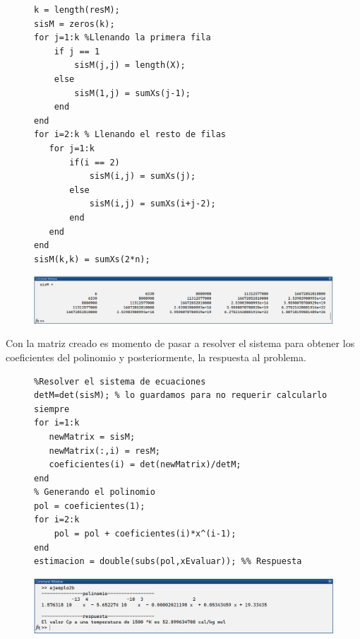 \documentclass[11pt,letterpaper]{article}
\begin{document}
\begin{figure}[H]
\begin{tcolorbox}[title=Ejemplo 2: Implementación en MATLAB]
\begin{verbatim}
k = length(resM);
sisM = zeros(k);
for j=1:k %Llenando la primera fila
    if j == 1
        sisM(j,j) = length(X);
    else
        sisM(1,j) = sumXs(j-1);
    end
end
for i=2:k % Llenando el resto de filas
   for j=1:k
       if(i == 2)
           sisM(i,j) = sumXs(j);
       else
           sisM(i,j) = sumXs(i+j-2);
       end
   end
end
sisM(k,k) = sumXs(2*n);
\end{verbatim}
\end{tcolorbox}
\end{figure}
\begin{figure}[H]
\centering
\includegraphics[width=6in]{sisM.png}
\label{figure:sisM}
\end{figure}
Con la matriz creado es momento de pasar a resolver el sistema para obtener los coeficientes del polinomio y posteriormente, la respuesta al problema.
\begin{figure}[H]
\begin{tcolorbox}[title=Ejemplo 2: Implementación en MATLAB]
\begin{verbatim}
%Resolver el sistema de ecuaciones
detM=det(sisM); % lo guardamos para no requerir calcularlo siempre
for i=1:k
   newMatrix = sisM;
   newMatrix(:,i) = resM;
   coeficientes(i) = det(newMatrix)/detM;
end
% Generando el polinomio
pol = coeficientes(1);
for i=2:k
    pol = pol + coeficientes(i)*x^(i-1);
end
estimacion = double(subs(pol,xEvaluar)); %% Respuesta
\end{verbatim}
\end{tcolorbox}
\end{figure}
\begin{figure}[H]
\centering
\includegraphics[width=6in]{ej2ans.png}
\label{figure:ans2}
\end{figure}





\end{document}
